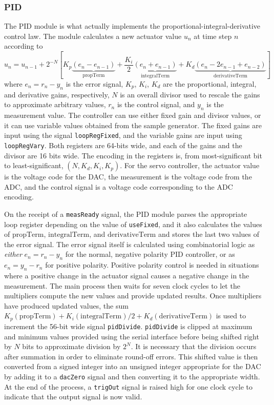 \documentclass{article}
\begin{document}
\subsubsection{PID}
The PID module is what actually implements the proportional-integral-derivative control law.  The module calculates a new actuator value $u_n$ at time step $n$ according to
\begin{equation}
u_n = u_{n-1}+2^{-N}\left[K_p\underset{\text{propTerm}}{\underbrace{(e_n-e_{n-1})}}+\frac{K_i}{2}\underset{\text{integralTerm}}{\underbrace{(e_{n}+e_{n-1})}}+K_d\underset{\text{derivativeTerm}}{\underbrace{(e_n-2e_{n-1}+e_{n-2})}}\right]
\label{eq:controlLaw}
\end{equation}
where $e_n = r_n - y_n$ is the error signal, $K_p$, $K_i$, $K_d$ are the proportional, integral, and derivative gains, respectively, $N$ is an overall divisor used to rescale the gains to approximate arbitrary values, $r_n$ is the control signal, and $y_n$ is the measurement value.  The controller can use either fixed gain and divisor values, or it can use variable values obtained from the sample generator.  The fixed gains are input using the signal \verb|loopRegFixed|, and the variable gains are input using \verb|loopRegVary|.  Both registers are 64-bits wide, and each of the gains and the divisor are 16 bits wide.  The encoding in the registers is, from most-significant bit to least-significant, $(N,K_d,K_i,K_p)$.  For the servo controller, the actuator value is the voltage code for the DAC, the measurement is the voltage code from the ADC, and the control signal is a voltage code corresponding to the ADC encoding.

On the receipt of a \verb|measReady| signal, the PID module parses the appropriate loop register depending on the value of \verb|useFixed|, and it also calculates the values of $\text{propTerm}$, $\text{integralTerm}$, and $\text{derivativeTerm}$ and stores the last two values of the error signal.  The error signal itself is calculated using combinatorial logic as \emph{either} $e_n = r_n-y_n$ for the normal, negative polarity PID controller, or as $e_n = y_n - r_n$ for positive polarity.  Positive polarity control is needed in situations where a positive change in the actuator signal causes a negative change in the measurement.  The main process then waits for seven clock cycles to let the multipliers compute the new values and provide updated results.  Once multipliers have produced updated values, the sum $K_p(\text{propTerm})+K_i(\text{integralTerm})/2+K_d(\text{derivativeTerm})$ is used to increment the 56-bit wide signal \verb|pidDivide|.  \verb|pidDivide| is clipped at maximum and minimum values provided using the serial interface before being shifted right by $N$ bits to approximate division by $2^N$.  It is necessary that the division occurs after summation in order to eliminate round-off errors.  This shifted value is then converted from a signed integer into an unsigned integer appropriate for the DAC by adding it to a \verb|dacZero| signal and then converting it to the appropriate width.  At the end of the process, a \verb|trigOut| signal is raised high for one clock cycle to indicate that the output signal is now valid.
\end{document}

